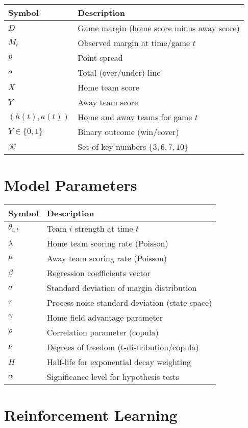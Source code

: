 \begin{tabular}{ll}
\toprule
\textbf{Symbol} & \textbf{Description} \\
\midrule
$D$ & Game margin (home score minus away score) \\
$M_t$ & Observed margin at time/game $t$ \\
$p$ & Point spread \\
$o$ & Total (over/under) line \\
$X$ & Home team score \\
$Y$ & Away team score \\
$(h(t), a(t))$ & Home and away teams for game $t$ \\
$Y \in \{0,1\}$ & Binary outcome (win/cover) \\
$\mathcal{K}$ & Set of key numbers $\{3, 6, 7, 10\}$ \\
\bottomrule
\end{tabular}

\section*{Model Parameters}

\begin{tabular}{ll}
\toprule
\textbf{Symbol} & \textbf{Description} \\
\midrule
$\theta_{i,t}$ & Team $i$ strength at time $t$ \\
$\lambda$ & Home team scoring rate (Poisson) \\
$\mu$ & Away team scoring rate (Poisson) \\
$\beta$ & Regression coefficients vector \\
$\sigma$ & Standard deviation of margin distribution \\
$\tau$ & Process noise standard deviation (state-space) \\
$\gamma$ & Home field advantage parameter \\
$\rho$ & Correlation parameter (copula) \\
$\nu$ & Degrees of freedom (t-distribution/copula) \\
$H$ & Half-life for exponential decay weighting \\
$\alpha$ & Significance level for hypothesis tests \\
\bottomrule
\end{tabular}

\section*{Reinforcement Learning}

